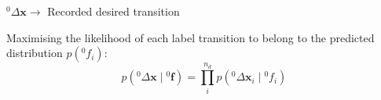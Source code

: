 \( {}^{0}\Delta \boldsymbol{x} \to \) Recorded desired transition

Maximising the likelihood of each label transition to belong to the predicted distribution \( p \left( {}^{0}f_i \right) \):
\begin{equation}
    p \left( {}^{0}\Delta \boldsymbol{x} \mid {}^{0}\boldsymbol{f} \right)
    =
    \prod_{i}^{n_d} p \left( {}^{0}\Delta \boldsymbol{x}_i \mid {}^{0}f_i \right)
\end{equation}
